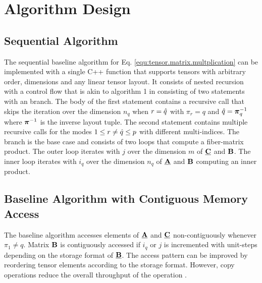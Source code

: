 \section{Algorithm Design}
\label{sec:design}
\subsection{Sequential Algorithm}
\label{sec:design:sequential.baseline.algorithm}
The sequential baseline algorithm for Eq. \ref{equ:tensor.matrix.multplication} can be implemented with a single C++ function that supports tensors with arbitrary order, dimensions and any linear tensor layout.
It consists of nested recursion with a control flow that is akin to algorithm 1 in \cite{bassoy:2018:fast} consisting of two  statements with an  branch.
The body of the first  statement contains a recursive call that skips the iteration over the dimension $n_{q}$ when $r = \hat{q}$ with $\pi_r = q$ and $\hat{q} = \boldsymbol{\pi}^{-1}_q$ where $\boldsymbol{\pi}^{-1}$ is the inverse layout tuple.
The second  statement contains multiple recursive calls for the modes $1 \leq r \neq \hat{q} \leq p$ with different multi-indices.
The  branch is the base case and consists of two loops that compute a fiber-matrix product.
The outer loop iterates with $j$ over the dimension $m$ of $\underline{\mathbf{C}}$ and $\mathbf{B}$.
The inner loop iterates with $i_q$ over the dimension $n_q$ of $\underline{\mathbf{A}}$ and $\mathbf{B}$ computing an inner product. 


\subsection{Baseline Algorithm with Contiguous Memory Access}
\label{sec:design:modified.baseline.algorithm}
The baseline algorithm accesses elements of $\underline{\mathbf{A}}$ and $\underline{\mathbf{C}}$ non-contiguously whenever $\pi_1 \neq q$. %
Matrix $\mathbf{B}$ is contiguously accessed if $i_q$ or $j$ is incremented with unit-steps depending on the storage format of $\underline{\mathbf{B}}$.
The access pattern can be improved by reordering tensor elements according to the storage format.
However, copy operations reduce the overall throughput of the operation \cite{shi:2016:tensor.contraction}.


